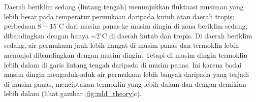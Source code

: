 \begin{spacing}{1.5}
	 Daerah beriklim sedang (lintang tengah) menunjukkan fluktuasi musiman yang lebih besar pada temperatur permukaan daripada kutub atau daerah tropis; perbedaan $8-15^\circ$C dari musim panas ke musim dingin di zona beriklim sedang, dibandingkan dengan hanya $\sim 2^\circ$C di daerah kutub dan tropis. Di daerah beriklim sedang, air permukaan jauh lebih hangat di musim panas dan termoklin lebih menonjol dibandingkan dengan musim dingin. Tetapi di musim dingin termoklin lebih dalam di garis lintang tengah daripada di musim panas. Ini karena badai musim dingin mengaduk-aduk air permukaan lebih banyak daripada yang terjadi di musim panas, menciptakan termoklin yang lebih dalam dan dengan demikian lebih dalam (lihat gambar \ref{fig:mld_theory}c).
\end{spacing}
\vspace{-0.1pc}
%
